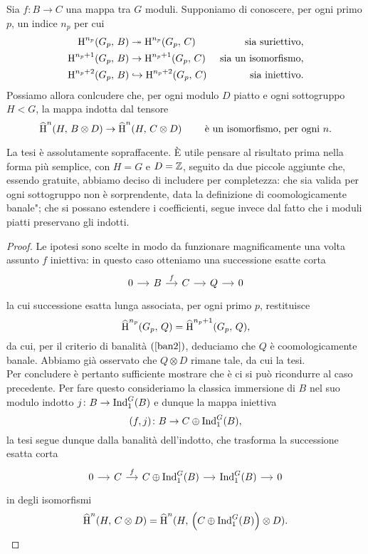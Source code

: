 \begin{proposition}
	Sia $ f \colon B \to C $ una mappa tra $ G $ moduli. Supponiamo di conoscere, per ogni primo $ p $, un indice $ n_p $ per cui
	\begin{align*}
		\operatorname{H}^{n_p}(G_p,\, B) &\twoheadrightarrow \operatorname{H}^{n_p}(G_p,\, C) & \text{ sia suriettivo,} \\
		\operatorname{H}^{n_p+1}(G_p,\, B) &\to \operatorname{H}^{n_p+1}(G_p,\, C) & \text{ sia un isomorfismo,} \\
		\operatorname{H}^{n_p+2}(G_p,\, B) &\hookrightarrow \operatorname{H}^{n_p+2}(G_p,\, C) & \text{ sia iniettivo.}
	\end{align*}
	Possiamo allora conlcudere che, per ogni modulo $ D $ piatto e ogni sottogruppo $ H < G $, la mappa indotta dal tensore
	\[ \operatorname{\widehat{H}}^n(H, \, B \otimes D) \to \operatorname{\widehat{H}}^n(H, \, C \otimes D) \qquad\text{ è un isomorfismo, per ogni } n. \]
\end{proposition}

La tesi è assolutamente sopraffacente. È utile pensare al risultato prima nella forma più semplice, con $ H=G $ e $ D = \mathbb{Z} $, seguito da due piccole aggiunte che, essendo gratuite, abbiamo deciso di includere per completezza: che sia valida per ogni sottogruppo non è sorprendente, data la definizione di \leftquote coomologicamente banale"; che si possano estendere i coefficienti, segue invece dal fatto che i moduli piatti preservano gli indotti. 

\begin{proof}
	Le ipotesi sono scelte in modo da funzionare magnificamente una volta assunto $ f $ iniettiva: in questo caso otteniamo una successione esatte corta
	\[ \begin{tikzcd}[column sep = small]
	0 \rar
	& B \rar["f"]
	& C \rar
	& Q \rar
	& 0 \end{tikzcd} \]
	la cui successione esatta lunga associata, per ogni primo $ p $, restituisce
	\[ \operatorname{\widehat{H}}^{n_p}(G_p, \, Q) = \operatorname{\widehat{H}}^{n_p+1}(G_p, \, Q), \]
	da cui, per il criterio di banalità $ (\ref{ban2}) $, deduciamo che $ Q $ è coomologicamente banale. Abbiamo già osservato che $ Q \otimes D $ rimane tale, da cui la tesi. \\
	
	Per concludere è pertanto sufficiente mostrare che è ci si può ricondurre al caso precedente. Per fare questo consideriamo la classica immersione di $ B $ nel suo modulo indotto $ j \colon B \to \operatorname{Ind}_1^G(B) $ e dunque la mappa iniettiva
	\[ (f, j)\colon B \to C \oplus \operatorname{Ind}_1^G(B), \]
	la tesi segue dunque dalla banalità dell'indotto, che trasforma la successione esatta corta
	\[ \begin{tikzcd}[column sep = small]
	0 \rar
	& C \rar["f"]
	& C \oplus \Ind_1^G(B) \rar
	& \Ind_1^G(B) \rar
	& 0 \end{tikzcd} \]
	in degli isomorfismi
	\[ \operatorname{\widehat{H}}^n(H, \, C \otimes D ) = \operatorname{\widehat{H}}^n(H, \, \left(C \oplus \operatorname{Ind}_1^G(B)\right) \otimes D ). \]
\end{proof}

